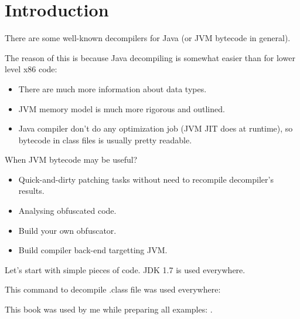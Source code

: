 \section{Introduction}

There are some well-known decompilers for Java (or \ac{JVM} bytecode in general).

The reason of this is because Java decompiling is somewhat easier 
than for lower level x86 code:

\begin{itemize}
\item There are much more information about data types.
\item \ac{JVM} memory model is much more rigorous and outlined.
\item Java compiler don't do any optimization job (\ac{JVM} \ac{JIT} does at runtime),
  so bytecode in class files is usually pretty readable.
\end{itemize}

When JVM bytecode may be useful?

\begin{itemize}
\item Quick-and-dirty patching tasks without need to recompile decompiler's results.
\item Analysing obfuscated code.
\item Build your own obfuscator.
\item Build compiler back-end targetting JVM.
\end{itemize}

Let's start with simple pieces of code.
JDK 1.7 is used everywhere.

This command to decompile .class file was used everywhere: 

This book was used by me while preparing all examples: \cite{JavaSE7}.
